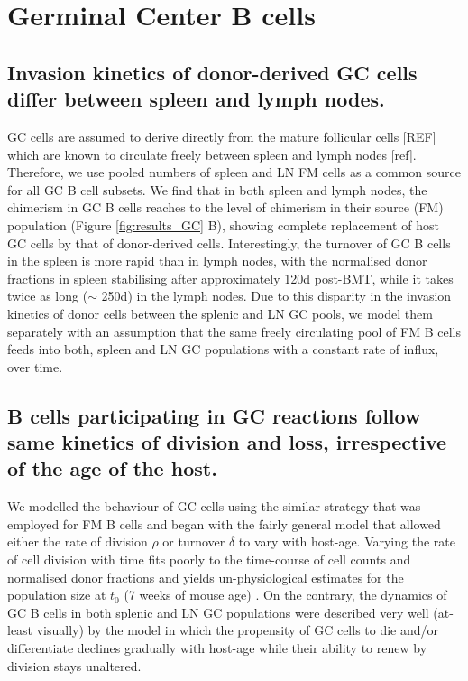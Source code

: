 \documentclass[11pt]{article}
\newcommand{\blue}[1]{{\color{blue}{#1}}}
\begin{document}
\blue{Note: Age-structured model gives visually bad fits for FM cells. \\
	When  fitting FM cells with the incumbent model, size of the incumbent population is estimated to be $\approx$ 0, making it equivalent to constant birth-death model. When fitting MZ model the counts of incumbent cells are estimated $\approx 10^5$. }


\clearpage

\section*{Germinal Center B cells}

	\subsection*{Invasion kinetics of donor-derived GC cells differ between spleen and lymph nodes.}
	GC cells are assumed to derive directly from the mature follicular cells [REF] which are known to circulate freely between spleen and lymph nodes [ref].
	Therefore, we use pooled numbers of spleen and LN FM cells as a common source for all GC B cell subsets.
	We find that in both spleen and lymph nodes, the chimerism in GC B cells reaches to the level of chimerism in their source (FM) population (Figure \ref{fig:results_GC} B), showing complete replacement of host GC cells by that of donor-derived cells. 
	Interestingly, the turnover of GC B cells in the spleen is more rapid than in lymph nodes, with the normalised donor fractions in spleen stabilising after approximately 120d  post-BMT, while it takes twice as long ($\sim$ 250d) in the lymph nodes.
	Due to this  disparity in the invasion kinetics of donor cells between the splenic and LN GC pools, we model them separately with an assumption that the same freely circulating pool of FM B cells feeds into both, spleen and LN GC populations with a constant rate of influx, over time. 
	
	\subsection*{B cells participating in GC reactions follow same kinetics of division and loss, irrespective of the age of the host.}
	We modelled the behaviour of GC cells using the similar strategy that was employed for FM B cells and began with the fairly general model that allowed either the rate of division $\rho$ or turnover $\delta$ to vary with host-age. 
	Varying the rate of cell division with time fits poorly to the time-course of cell counts and normalised donor fractions and yields un-physiological estimates for the population size at $t_0$ (7 weeks of mouse age)  .
	On the contrary, the dynamics of GC B cells in both splenic and LN GC populations were described very well (at-least visually) by the model in which the propensity of GC cells to die and/or differentiate declines gradually with host-age while their ability to renew by division stays unaltered.
	
\end{document}
